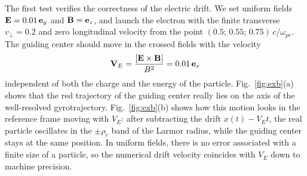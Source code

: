 \documentclass[final,3p]{elsarticle}
\begin{document}
The first test verifies the correctness of the electric drift. We set uniform fields ${\bf E}=0.01\,{\bf e}_y$ and ${\bf B}={\bf e}_z$, and launch the electron with the finite transverse $v_\perp=0.2$ and zero longitudinal velocity from the point $(0.5;\,0.55;\,0.75)\,c/\omega_{pe}$. The guiding center should move in the crossed fields with the velocity
 \begin{equation}\label{vexb}
	{\bf V}_E=\frac{\left[{\bf E}\times{\bf B}\right]}{B^2}=0.01\,{\bf e}_x
\end{equation}
independent of both the charge and the energy of the particle. Fig.~\ref{fig:exb}(a) shows that the red trajectory of the guiding center really lies on the axis of the well-resolved gyrotrajectory. Fig.~\ref{fig:exb}(b) shows how this motion looks in the reference frame moving with $V_E$: after subtracting the drift $x(t)-V_E t$, the real particle oscillates in the $\pm\rho_e$ band of the Larmor radius, while the guiding center stays at the same position. In uniform fields, there is no error associated with a finite size of a particle, so the numerical drift velocity coincides with $V_E$ down to machine precision.
\end{document}

